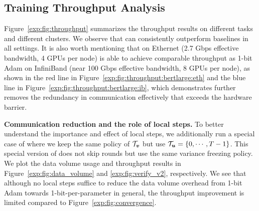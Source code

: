 \subsection{Training Throughput Analysis}
Figure~\ref{exp:fig:throughput} summarizes the throughput results on different tasks and different clusters. We observe that {\myalgo} can consistently outperform baselines in all settings.
It is also worth mentioning that {\myalgo} on Ethernet (2.7 Gbps effective bandwidth, 4 GPUs per node) is able to achieve comparable throughput as 1-bit Adam on InfiniBand (near 100 Gbps effective bandwidth, 8 GPUs per node), as shown in the red line in Figure~\ref{exp:fig:throughput:bertlarge:eth} and the blue line in Figure~\ref{exp:fig:throughput:bertlarge:ib}, which demonstrates {\myalgo} further removes the redundancy in communication effectively that exceeds the hardware barrier.

\textbf{Communication reduction and the role of local steps.}
To better understand the importance and effect of local steps, we additionally run a special case of {\myalgo} where we keep the same policy of $\mathcal{T}_{\boldsymbol{v}}$ but use $\mathcal{T}_{\boldsymbol{u}}=\{0, \cdots, T-1\}$. This special version of {\myalgo} does not skip rounds but use the same variance freezing policy. We plot the data volume usage and throughput results in Figure~\ref{exp:fig:data_volume} and \ref{exp:fig:verify_v2}, respectively. We see that although no local steps suffice to reduce the data volume overhead from 1-bit Adam towards 1-bit-per-parameter in general, the throughput improvement is limited compared to Figure~\ref{exp:fig:convergence}.
